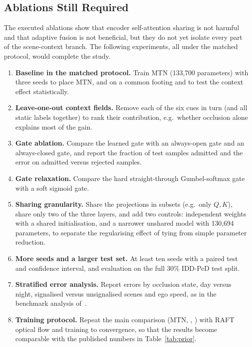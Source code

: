 \subsection{Ablations Still Required}
The executed ablations show that encoder self-attention sharing is not harmful and that adaptive fusion is not beneficial, but they do not yet isolate every part of the scene-context branch. The following experiments, all under the matched protocol, would complete the study.
\begin{enumerate}[leftmargin=1.6em,itemsep=1pt,topsep=2pt]
\item \textbf{Baseline in the matched protocol.} Train MTN (133,700 parameters) with three seeds to place MTN, \CAMTN and \CAMTNS on a common footing and to test the context effect statistically.
\item \textbf{Leave-one-out context fields.} Remove each of the six cues in turn (and all static labels together) to rank their contribution, e.g.\ whether occlusion alone explains most of the gain.
\item \textbf{Gate ablation.} Compare the learned gate with an always-open gate and an always-closed gate, and report the fraction of test samples admitted and the error on admitted versus rejected samples.
\item \textbf{Gate relaxation.} Compare the hard straight-through Gumbel-softmax gate with a soft sigmoid gate.
\item \textbf{Sharing granularity.} Share the projections in subsets (e.g.\ only $Q,K$), share only two of the three layers, and add two controls: independent weights with a shared initialisation, and a narrower unshared model with 130,694 parameters, to separate the regularising effect of tying from simple parameter reduction.
\item \textbf{More seeds and a larger test set.} At least ten seeds with a paired test and confidence interval, and evaluation on the full 30\% IDD-PeD test split.
\item \textbf{Stratified error analysis.} Report errors by occlusion state, day versus night, signalised versus unsignalised scenes and ego speed, as in the benchmark analysis of~\citep{iddped2025}.
\item \textbf{Training protocol.} Repeat the main comparison (MTN, \CAMTN, \CAMTNS) with RAFT optical flow and training to convergence, so that the results become comparable with the published numbers in Table~\ref{tab:prior}.
\end{enumerate}
